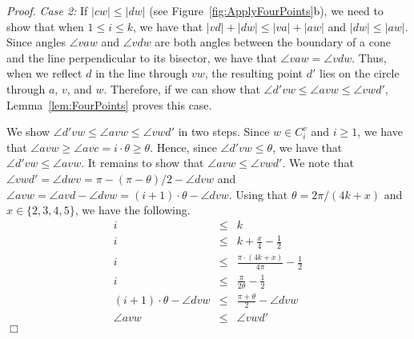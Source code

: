 \documentclass[12pt]{article}
\newenvironment{proof}{\emph{Proof.}}{\hfill $\Box$\\}
\begin{document}
\begin{proof}
  \textit{Case 2:} If $|c w| \leq |d w|$ (see Figure~\ref{fig:ApplyFourPoints}b), we need to show that when $1 \leq i \leq k$, we have that $|v d| + |d w| \leq |v a| + |a w|$ and $|d w| \leq |a w|$. Since angles $\angle vaw$ and $\angle vdw$ are both angles between the boundary of a cone and the line perpendicular to its bisector, we have that $\angle vaw = \angle vdw$. Thus, when we reflect $d$ in the line through $v w$, the resulting point $d'$ lies on the circle through $a$, $v$, and $w$. Therefore, if we can show that $\angle d'vw \leq \angle avw \leq \angle vwd'$, Lemma~\ref{lem:FourPoints} proves this case. 

  We show $\angle d'vw \leq \angle avw \leq \angle vwd'$ in two steps. Since $w \in C_i^v$ and $i \geq 1$, we have that $\angle avw \geq \angle avc = i \cdot \theta \geq \theta$. Hence, since $\angle d'vw \leq \theta$, we have that $\angle d'vw \leq \angle avw$. It remains to show that $\angle avw \leq \angle vwd'$. We note that $\angle vwd' = \angle dwv = \pi - (\pi - \theta)/2 - \angle dvw$ and $\angle avw = \angle avd - \angle dvw = (i + 1) \cdot \theta - \angle dvw$. Using that $\theta = 2 \pi / (4 k + x)$ and $x \in \{2, 3, 4, 5\}$, we have the following. 
  \begin{eqnarray*}
    i &\leq& k \\
    i &\leq& k + \frac{x}{4} - \frac{1}{2} \\
    i &\leq& \frac{\pi \cdot (4 k + x)}{4 \pi} - \frac{1}{2} \\
    i &\leq& \frac{\pi}{2 \theta} - \frac{1}{2} \\
    (i + 1) \cdot \theta - \angle dvw &\leq& \frac{\pi + \theta}{2} - \angle dvw \\
    \angle avw &\leq& \angle vwd' 
  \end{eqnarray*} 
\end{proof}
\end{document}
